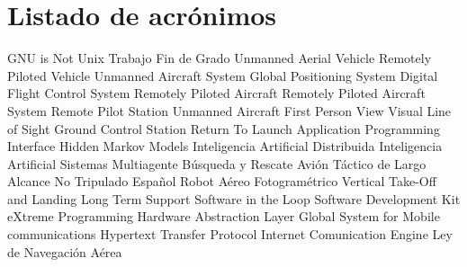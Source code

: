 \chapter{Listado de acrónimos}

{\small
\begin{acronym}[TFG]
       {\acs{GNU} is Not Unix}
       {Trabajo Fin de Grado}
       {Unmanned Aerial Vehicle}
       {Remotely Piloted Vehicle}
       {Unmanned Aircraft System}
       {Global Positioning System}
      {Digital Flight Control System}
       {Remotely Piloted Aircraft}
      {Remotely Piloted Aircraft System}
       {Remote Pilot Station}
        {Unmanned Aircraft} 
       {First Person View}
      {Visual Line of Sight} 
       {Ground Control Station}
       {Return To Launch}
       {Application Programming Interface}
       {Hidden Markov Models}
       {Inteligencia Artificial Distribuida}
  	 {Inteligencia Artificial}
  	 {Sistemas Multiagente}
       {Búsqueda y Rescate}
   {Avión Táctico de Largo Alcance No Tripulado Español}
  	 {Robot Aéreo Fotogramétrico}
  	 {Vertical Take-Off and Landing}
  	 {Long Term Support}
  	 {Software in the Loop}
  	 {Software Development Kit}
  	 {eXtreme Programming}
  	 {Hardware Abstraction Layer}
  	 {Global System for Mobile communications}
  	 {Hypertext Transfer Protocol}
  	 {Internet Comunication Engine}
  	 {Ley de Navegación Aérea}
\end{acronym}
}




